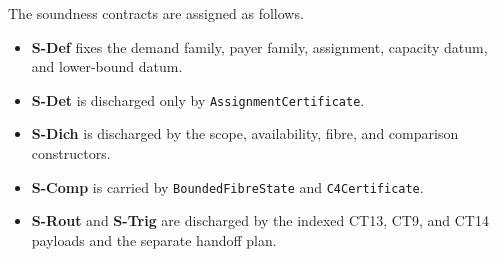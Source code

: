 The soundness contracts are assigned as follows.
\begin{itemize}
\tightlist
\item \textbf{S-Def} fixes the demand family, payer family, assignment, capacity datum, and lower-bound datum.
\item \textbf{S-Det} is discharged only by \texttt{AssignmentCertificate}.
\item \textbf{S-Dich} is discharged by the scope, availability, fibre, and comparison constructors.
\item \textbf{S-Comp} is carried by \texttt{BoundedFibreState} and \texttt{C4Certificate}.
\item \textbf{S-Rout} and \textbf{S-Trig} are discharged by the indexed CT13, CT9, and CT14 payloads and the separate handoff plan.
\end{itemize}

